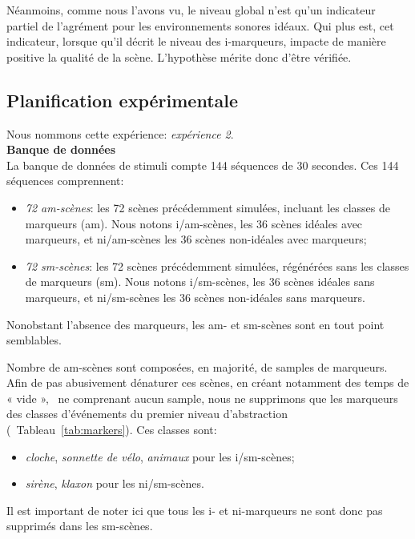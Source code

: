 Néanmoins, comme nous l'avons vu, le niveau global n'est qu'un indicateur partiel de l'agrément pour les environnements sonores idéaux. Qui plus est, cet indicateur, lorsque qu'il décrit le niveau des i-marqueurs, impacte de manière positive la qualité de la scène. L'hypothèse mérite donc d'être vérifiée.

\subsection{Planification expérimentale}

Nous nommons cette expérience: \emph{expérience 2}. \\

{\setlength{\parindent}{0cm}\textbf{Banque de données}} \\

La banque de données de stimuli compte 144 séquences de 30 secondes. Ces 144 séquences comprennent:

\begin{itemize}
\item \emph{72 am-scènes}: les 72 scènes précédemment simulées, incluant les classes de marqueurs (am). Nous notons i/am-scènes, les 36 scènes idéales avec marqueurs, et ni/am-scènes les 36 scènes non-idéales avec marqueurs;
\item \emph{72 sm-scènes}: les 72 scènes précédemment simulées, régénérées sans les classes de marqueurs (sm). Nous notons i/sm-scènes, les 36 scènes idéales sans marqueurs, et ni/sm-scènes les 36 scènes non-idéales sans marqueurs.
\end{itemize}

Nonobstant l'absence des marqueurs, les am- et sm-scènes sont en tout point semblables. 

Nombre de am-scènes sont composées, en majorité, de samples de marqueurs. Afin de pas abusivement dénaturer ces scènes, en créant notamment des temps de « vide », \ie~ne comprenant aucun sample, nous ne supprimons que les marqueurs des classes d'événements du premier niveau d'abstraction (\cf~Tableau~\ref{tab:markers}). Ces classes sont: 

\begin{itemize}
\item \emph{cloche}, \emph{sonnette de vélo}, \emph{animaux} pour les i/sm-scènes;
\item \emph{sirène}, \emph{klaxon} pour les ni/sm-scènes.
\end{itemize}
 
Il est important de noter ici que tous les i- et ni-marqueurs ne sont donc pas supprimés dans les sm-scènes. \\
 
